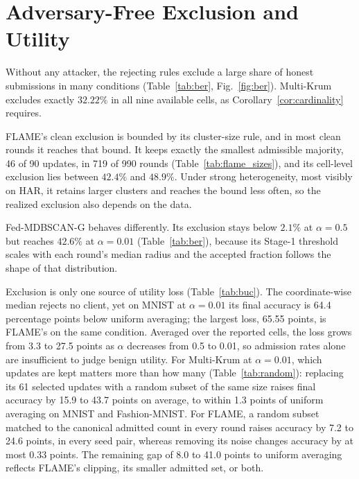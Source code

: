 \documentclass[journal]{IEEEtran}
\newcommand{\method}{Fed-MDBSCAN-G}
\begin{document}
\section{Adversary-Free Exclusion and Utility}\label{sec:benign}





Without any attacker, the rejecting rules exclude a large share of honest submissions in many conditions (Table~\ref{tab:ber}, Fig.~\ref{fig:ber}). Multi-Krum excludes exactly $32.22\%$ in all nine available cells, as Corollary~\ref{cor:cardinality} requires.

FLAME's clean exclusion is bounded by its cluster-size rule, and in most clean rounds it reaches that bound. It keeps exactly the smallest admissible majority, 46 of 90 updates, in 719 of 990 rounds (Table~\ref{tab:flame_sizes}), and its cell-level exclusion lies between $42.4\%$ and $48.9\%$. Under strong heterogeneity, most visibly on HAR, it retains larger clusters and reaches the bound less often, so the realized exclusion also depends on the data.

\method{} behaves differently. Its exclusion stays below $2.1\%$ at $\alpha=0.5$ but reaches $42.6\%$ at $\alpha=0.01$ (Table~\ref{tab:ber}), because its Stage-1 threshold scales with each round's median radius and the accepted fraction follows the shape of that distribution.

Exclusion is only one source of utility loss (Table~\ref{tab:buc}). The coordinate-wise median rejects no client, yet on MNIST at $\alpha=0.01$ its final accuracy is 64.4 percentage points below uniform averaging; the largest loss, 65.55 points, is FLAME's on the same condition. Averaged over the reported cells, the loss grows from 3.3 to 27.5 points as $\alpha$ decreases from 0.5 to 0.01, so admission rates alone are insufficient to judge benign utility. For Multi-Krum at $\alpha=0.01$, which updates are kept matters more than how many (Table~\ref{tab:random}): replacing its 61 selected updates with a random subset of the same size raises final accuracy by 15.9 to 43.7 points on average, to within 1.3 points of uniform averaging on MNIST and Fashion-MNIST. For FLAME, a random subset matched to the canonical admitted count in every round raises accuracy by 7.2 to 24.6 points, in every seed pair, whereas removing its noise changes accuracy by at most 0.33 points. The remaining gap of 8.0 to 41.0 points to uniform averaging reflects FLAME's clipping, its smaller admitted set, or both.
\end{document}
